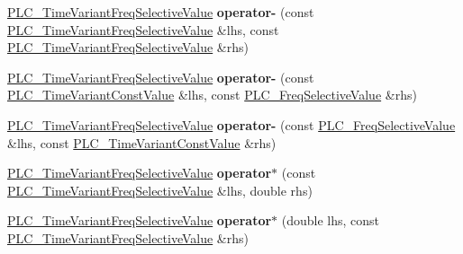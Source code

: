 \begin{DoxyCompactItemize}
\item 
\hypertarget{classns3_1_1PLC__TimeVariantFreqSelectiveValue_a0284de9ce4521d32288ddba8343135b3}{\hyperlink{classns3_1_1PLC__TimeVariantFreqSelectiveValue}{\-P\-L\-C\-\_\-\-Time\-Variant\-Freq\-Selective\-Value} {\bfseries operator-\/} (const \hyperlink{classns3_1_1PLC__TimeVariantFreqSelectiveValue}{\-P\-L\-C\-\_\-\-Time\-Variant\-Freq\-Selective\-Value} \&lhs, const \hyperlink{classns3_1_1PLC__TimeVariantFreqSelectiveValue}{\-P\-L\-C\-\_\-\-Time\-Variant\-Freq\-Selective\-Value} \&rhs)}\label{classns3_1_1PLC__TimeVariantFreqSelectiveValue_a0284de9ce4521d32288ddba8343135b3}

\item 
\hypertarget{classns3_1_1PLC__TimeVariantFreqSelectiveValue_a67c677f135b0983559bc0ac2960e4976}{\hyperlink{classns3_1_1PLC__TimeVariantFreqSelectiveValue}{\-P\-L\-C\-\_\-\-Time\-Variant\-Freq\-Selective\-Value} {\bfseries operator-\/} (const \hyperlink{classns3_1_1PLC__TimeVariantConstValue}{\-P\-L\-C\-\_\-\-Time\-Variant\-Const\-Value} \&lhs, const \hyperlink{classns3_1_1PLC__FreqSelectiveValue}{\-P\-L\-C\-\_\-\-Freq\-Selective\-Value} \&rhs)}\label{classns3_1_1PLC__TimeVariantFreqSelectiveValue_a67c677f135b0983559bc0ac2960e4976}

\item 
\hypertarget{classns3_1_1PLC__TimeVariantFreqSelectiveValue_a22bab1bb6d37a86e6bd3e6b979d911ea}{\hyperlink{classns3_1_1PLC__TimeVariantFreqSelectiveValue}{\-P\-L\-C\-\_\-\-Time\-Variant\-Freq\-Selective\-Value} {\bfseries operator-\/} (const \hyperlink{classns3_1_1PLC__FreqSelectiveValue}{\-P\-L\-C\-\_\-\-Freq\-Selective\-Value} \&lhs, const \hyperlink{classns3_1_1PLC__TimeVariantConstValue}{\-P\-L\-C\-\_\-\-Time\-Variant\-Const\-Value} \&rhs)}\label{classns3_1_1PLC__TimeVariantFreqSelectiveValue_a22bab1bb6d37a86e6bd3e6b979d911ea}

\item 
\hypertarget{classns3_1_1PLC__TimeVariantFreqSelectiveValue_a687c45d93bf6abe84bf4845d3e06b192}{\hyperlink{classns3_1_1PLC__TimeVariantFreqSelectiveValue}{\-P\-L\-C\-\_\-\-Time\-Variant\-Freq\-Selective\-Value} {\bfseries operator$\ast$} (const \hyperlink{classns3_1_1PLC__TimeVariantFreqSelectiveValue}{\-P\-L\-C\-\_\-\-Time\-Variant\-Freq\-Selective\-Value} \&lhs, double rhs)}\label{classns3_1_1PLC__TimeVariantFreqSelectiveValue_a687c45d93bf6abe84bf4845d3e06b192}

\item 
\hypertarget{classns3_1_1PLC__TimeVariantFreqSelectiveValue_a28a3759a9e241858b395c09675f25aeb}{\hyperlink{classns3_1_1PLC__TimeVariantFreqSelectiveValue}{\-P\-L\-C\-\_\-\-Time\-Variant\-Freq\-Selective\-Value} {\bfseries operator$\ast$} (double lhs, const \hyperlink{classns3_1_1PLC__TimeVariantFreqSelectiveValue}{\-P\-L\-C\-\_\-\-Time\-Variant\-Freq\-Selective\-Value} \&rhs)}\label{classns3_1_1PLC__TimeVariantFreqSelectiveValue_a28a3759a9e241858b395c09675f25aeb}


\end{DoxyCompactItemize}
